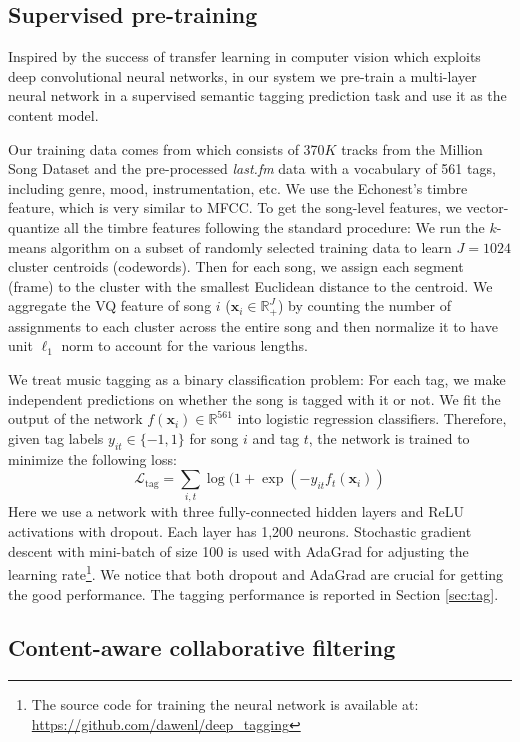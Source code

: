 \subsection{Supervised pre-training} \label{sec:nnet}

Inspired by the success of transfer learning in computer vision which exploits deep convolutional neural networks\cite{krizhevsky2012imagenet}, in our system we pre-train a multi-layer neural network in a supervised semantic tagging prediction task and use it as the content model. 

Our training data comes from \citet{liang2014codebook} which consists of 370$K$ tracks from the Million Song Dataset and the pre-processed \emph{last.fm} data with a vocabulary of 561 tags, including genre, mood, instrumentation, etc. We use the Echonest's timbre feature, which is very similar to MFCC. To get the song-level features, we vector-quantize all the timbre features following the standard procedure: We run the $k$-means algorithm on a subset of randomly selected training data to learn $J = 1024$ cluster centroids (codewords). Then for each song, we assign each segment (frame) to the cluster with the smallest Euclidean distance to the centroid. We aggregate the VQ feature of song $i$ ($\boldsymbol{x}_i \in \mathbb{R}_+^{J}$) by counting the number of assignments to each cluster across the entire song and then normalize it to have unit $\ell_1$ norm to account for the various lengths.

We treat music tagging as a binary classification problem: For each tag, we make independent predictions on whether the song is tagged with it or not. We fit the output of the network $f(\boldsymbol{x}_i) \in \mathbb{R}^{561}$ into logistic regression classifiers. Therefore, given tag labels $y_{it} \in \{-1, 1\}$ for song $i$ and tag $t$, the network is trained to minimize the following loss:
\[\mathcal{L}_{\text{tag}} = \textstyle\sum_{i, t} \log (1 + \exp(-y_{it} f_t(\boldsymbol{x}_i))\]
Here we use a network with three fully-connected hidden layers and ReLU activations with dropout. Each layer has 1,200 neurons. Stochastic gradient descent with mini-batch of size 100 is used with AdaGrad \cite{duchi2011adaptive} for adjusting the learning rate\footnote{The source code for training the neural network is available at: \url{https://github.com/dawenl/deep_tagging}}. We notice that both dropout and AdaGrad are crucial for getting the good performance. The tagging performance is reported in Section \ref{sec:tag}.

\subsection{Content-aware collaborative filtering} \label{sec:content}

